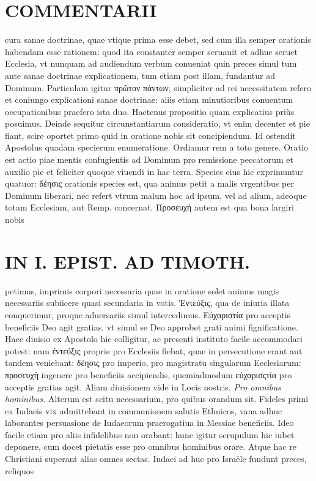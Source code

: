 \documentclass{article}
\begin{document}
\begin{pages}
\section*{COMMENTARII }
\marginpar{[ p.44 ]}\pstart cura sanae doctrinae, quae vtique prima esse debet, sed cum illa semper orationis habendam esse rationem: quod ita constanter semper seruauit et adhuc seruet Ecclesia, vt nunquam ad audiendum verbum conueniat quin preces simul tum ante sanae doctrinae explicationem, tum etiam post illam, fundantur ad Dominum. Particulam igitur πρῶτον πάντων, simpliciter ad rei necessitatem refero et coniungo explicationi sanae doctrinae: aliis etiam minutioribus conuentum occupationibus praefero ista duo. Hactenus propositio quam explicatius priùs posuimus.  \pend\pstart Deinde sequitur circunstantiarum consideratio, vt enim decenter et pie fiant, scire oportet primo quid in oratione nobis sit concipiendum. Id ostendit Apostolus quadam specierum enumeratione. Ordiamur rem a toto genere.  \pend\pstart Oratio est actio piae mentis confugientis ad Dominum pro remissione peccatorum et auxilio pie et feliciter quoque viuendi in hac terra. Species eius hic exprimuntur quatuor: δέησις orationis species est, qua animus petit a malis vrgentibus per Dominum liberari, nec refert vtrum malum hoc ad ipsum, vel ad alium, adeoque totam Ecclesiam, aut Remp. concernat. Προσευχὴ autem est qua bona largiri nobis  \pend
\section*{IN I. EPIST. AD TIMOTH. }
\marginpar{[ p.45 ]}\pstart petimus, imprimis corpori necessaria quae in oratione solet animus magis necessariis subiicere quasi secundaria in votis.  \pend\pstart Ἐντεύξις, qua de iniuria illata conquerimur, proque aduersariis simul intercedimus. Εὐχαριστία pro acceptis beneficiis Deo agit gratias, vt simul se Deo approbet grati animi fignificatione. Haec diuisio ex Apostolo hic colligitur, ac presenti instituto facile accommodari potest: nam ἐντεύξις proprie pro Ecclesiis fiebat, quae in persecutione erant aut tandem veniebant: δέησις pro imperio, pro magistratu singularum Ecclesiarum: προσευχὴ ingenere pro beneficiis accipiendis, quemiadmodum εὐχαρισςτία pro acceptis gratias agit. Aliam diuisionem vide in Locis nostris.  \pend
\textit{Pro omnibus hominibus. }\pstart Alterum est scitu necessarium, pro quibus orandum sit. Fideles primi ex Iudaeis vix admittebant in communionem salutis Ethnicos, vana adhuc laborantes persuasione de Iudaeorum praerogatiua in Messiae beneficiis. Ideo facile etiam pro aliis infidelibus non orabant: hunc igitur scrupulum hic iubet deponere, cum docet pietatis esse pro omnibus hominibus orare. Atque hac re Christiani superant alias omnes sectas. Iudaei ad huc pro Israële fundunt preces, reliquos  \pend

\end{pages}
\end{document}
